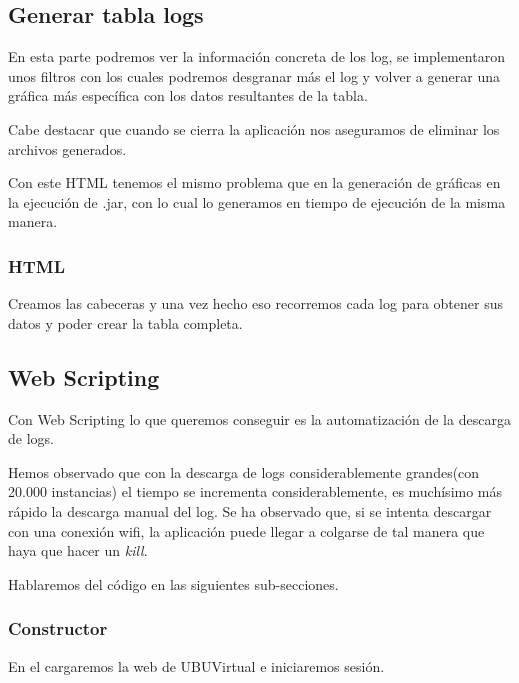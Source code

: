 \subsection{Generar tabla logs}\label{generar-tabla-log}
 
 En esta parte podremos ver la información concreta de los log, se implementaron unos filtros con los cuales podremos desgranar más el log y volver a generar una gráfica más específica con los datos resultantes de la tabla.
 
 Cabe destacar que cuando se cierra la aplicación nos aseguramos de eliminar los archivos generados.
 
 Con este HTML tenemos el mismo problema que en la generación de gráficas en la ejecución de .jar, con lo cual lo generamos en tiempo de ejecución de la misma manera.
 
\subsubsection{HTML}\label{html-tabla-log}
 

Creamos las cabeceras y una vez hecho eso recorremos cada log para obtener sus datos y poder crear la tabla completa.

\subsection{Web Scripting}\label{web-scripting}

Con Web Scripting lo que queremos conseguir es la automatización de la descarga de logs.

Hemos observado que con la descarga de logs considerablemente grandes(con 20.000 instancias) el tiempo se incrementa considerablemente, es muchísimo más rápido la descarga manual del log. Se ha observado que, si se intenta descargar con una conexión wifi, la aplicación puede llegar a colgarse de tal manera que haya que hacer un \emph{kill}.

Hablaremos del código en las siguientes sub-secciones.

\subsubsection{Constructor}\label{constructor}

En el cargaremos la web de UBUVirtual e iniciaremos sesión.

